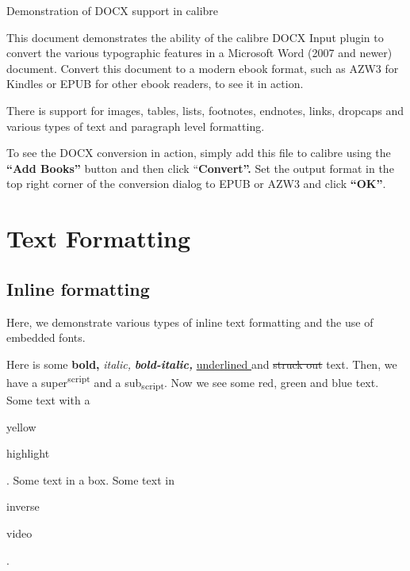 \documentclass[\officeparserdriver 12pt]{article}
\providecommand{\ophlaaaaaa}[1]{{\setlength{\fboxsep}{1pt}\colorbox{hex000000}{\strut #1}}}
\providecommand{\ophlppppaa}[1]{{\setlength{\fboxsep}{1pt}\colorbox{hexFFFF00}{\strut #1}}}
\begin{document}
\label{_Toc581531977}\textcolor{hex17365D}{{\fontsize{26pt}{31.2pt}\selectfont Demonstration of DOCX support in calibre}}

{\hspace*{21.6bp}This document demonstrates the ability of the calibre DOCX Input plugin to convert the various typographic features in a Microsoft Word (2007 and newer) document. Convert this document to a modern ebook format, such as AZW3 for Kindles or EPUB for other ebook readers, to see it in action.\par}

{\hspace*{21.6bp}There is support for images, tables, lists, footnotes, endnotes, links, dropcaps and various types of text and paragraph level formatting.\par}

{\hspace*{21.6bp}To see the DOCX conversion in action, simply add this file to calibre using the \textbf{“Add Books” }button and then click “\textbf{Convert”. } Set the output format in the top right corner of the conversion dialog to EPUB or AZW3 and click \textbf{“OK”}.\par}

\section[{Text Formatting}]{\protect\textcolor{hex365F91}{Text Formatting}}\label{_Toc2054249818}\label{text-formatting}

\subsection[{Inline formatting}]{\protect\textcolor{hex4F81BD}{Inline formatting}}\label{_Toc2137712100}\label{inline-formatting}

{\hspace*{21.6bp}Here, we demonstrate various types of inline text formatting and the use of embedded fonts.\par}

{\hspace*{21.6bp}Here is some \textbf{bold, }\textit{italic, }\textit{\textbf{bold-italic, }}\uline{underlined }and \sout{struck out } text. Then, we have a super\textsuperscript{script} and a sub\textsubscript{script}. Now we see some \textcolor{hexFF0000}{red}, \textcolor{hex92D050}{green} and \textcolor{hex0070C0}{blue} text. Some text with a \ophlppppaa{yellow} \ophlppppaa{highlight}. Some text in a box. Some text in \textcolor{hexFFFFFF}{\ophlaaaaaa{inverse} \ophlaaaaaa{video}}.\par}
\end{document}

